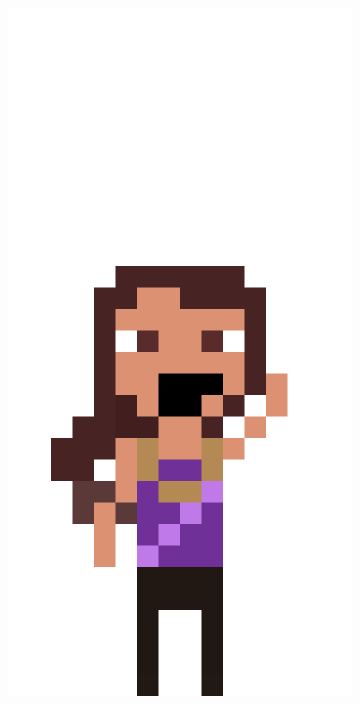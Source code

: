 \begin{figure}[htbp]
    \centering
    \caption{\small Sprites usados para o teste no Animated Drawnings}
    \label{fig:sketchArtefatos}
    \begin{subfigure}{0.32\linewidth}
        \includegraphics[width=1\linewidth]{figs/sprites/irma.PNG}

\end{subfigure}
\end{figure}
